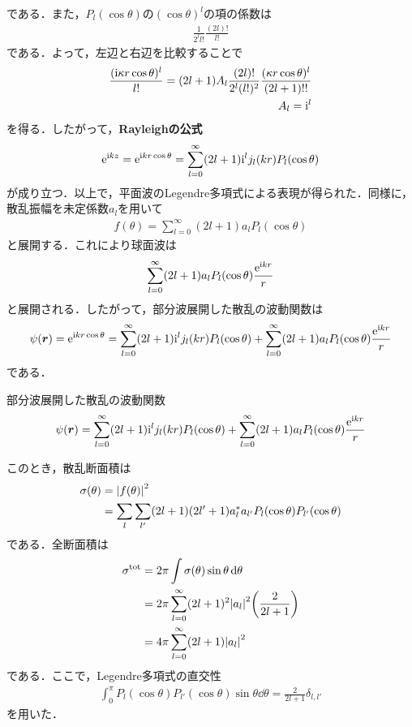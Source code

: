 \documentclass{report}
\begin{document}
  である．また，$P_l(\cos\theta)$の$(\cos\theta)^l$の項の係数は
  \begin{align}
    \frac{1}{2^l l!}\frac{(2l)!}{l!}
  \end{align}
  である．よって，左辺と右辺を比較することで
  \begin{align}
    \frac{(\mathrm{i} \kappa r \cos\theta)^l}{l!} = (2l+1)A_l \frac{(2l)!}{2^l (l!)^2}\frac{(\kappa r \cos\theta)^l}{(2l+1)!!}\\
    A_l = \mathrm{i}^l
  \end{align}
  を得る．したがって，\textbf{Rayleighの公式}
  \begin{align}
    \mathrm{e}^{\mathrm{i} kz} = \mathrm{e}^{\mathrm{i} kr\cos\theta} = \sum_{l=0}^{\infty} (2l+1)\mathrm{i}^l j_l(kr)P_l(\cos\theta)
  \end{align}
  が成り立つ．以上で，平面波のLegendre多項式による表現が得られた．同様に，散乱振幅を未定係数$a_l$を用いて
  \begin{align}
    f(\theta) = \sum_{l=0}^{\infty} (2l+1)a_l P_l(\cos\theta)
  \end{align}
  と展開する．これにより球面波は
  \begin{align}
    \sum_{l=0}^{\infty} (2l+1)a_l P_l(\cos\theta) \frac{\mathrm{e}^{\mathrm{i} kr}}{r}
  \end{align}
  と展開される．したがって，部分波展開した散乱の波動関数は
  \begin{align}
    \psi(\bm{r}) = \mathrm{e}^{\mathrm{i} kr\cos\theta} = \sum_{l=0}^{\infty} (2l+1)\mathrm{i}^l j_l(kr)P_l(\cos\theta) + \sum_{l=0}^{\infty} (2l+1)a_l P_l(\cos\theta) \frac{\mathrm{e}^{\mathrm{i} kr}}{r}
  \end{align}
  である．
  \begin{itembox}[l]{部分波展開した散乱の波動関数}
  \begin{equation}
    \label{PartialWave}
    \psi(\bm{r}) = \sum_{l=0}^{\infty} (2l+1)\mathrm{i}^l j_l(kr)P_l(\cos\theta) + \sum_{l=0}^{\infty} (2l+1)a_l P_l(\cos\theta) \frac{\mathrm{e}^{\mathrm{i} kr}}{r}
  \end{equation}
  \end{itembox}
  このとき，散乱断面積は
  \begin{align}
    \sigma(\theta) &= \abs{f(\theta)}^2\\
    &= \sum_{l} \sum_{l'} (2l+1)(2l'+1) a_l^{*}a_{l'} P_l(\cos\theta) P_{l'}(\cos\theta)
  \end{align}
  である．全断面積は
  \begin{align}
    \sigma^{\mathrm{tot}} &= 2\pi \int \sigma(\theta) \sin\theta \dd{\theta}\\
    &= 2\pi \sum_{l=0}^{\infty} (2l+1)^2\abs{a_l}^2\qty(\frac{2}{2l+1})\\
    &= 4\pi \sum_{l=0}^{\infty} (2l+1) \abs{a_l}^2
  \end{align}
  である．ここで，Legendre多項式の直交性
  \begin{align}
    \int_{0}^{\pi} P_l(\cos\theta)P_{l'}(\cos\theta) \sin\theta \dd{\theta} = \frac{2}{2l+1}\delta_{l,l'}
  \end{align}
  を用いた．
\end{document}
